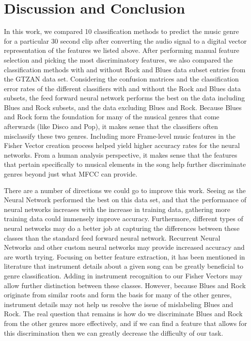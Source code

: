 \documentclass{article} %
\begin{document}
\section{Discussion and Conclusion}
In this work, we compared 10 classification methods to predict the music genre for a particular 30 second clip after converting the audio signal to a digital vector representation of the features we listed above. After performing manual feature selection and picking the most discriminatory features, we also compared the classification methods with and without Rock and Blues data subset entries from the GTZAN data set. Considering the confusion matrices and the classification error rates of the different classifiers with and without the Rock and Blues data subsets, the feed forward neural network performs the best on the data including Blues and Rock subsets, and the data excluding Blues and Rock. Because Blues and Rock form the foundation for many of the musical genres that come afterwards (like Disco and Pop), it makes sense that the classifiers often misclassify these two genres. Including more Frame-level music features in the Fisher Vector creation process helped yield higher accuracy rates for the neural networks. From a human analysis perspective, it makes sense that the features that pertain specifically to musical elements in the song help further discriminate genres beyond just what MFCC can provide.

There are a number of directions we could go to improve this work. Seeing as the Neural Network performed the best on this data set, and that the performance of neural networks increases with the increase in training data, gathering more training data could immensely improve accuracy. Furthermore, different types of neural networks may do a better job at capturing the differences between these classes than the standard feed forward neural network. Recurrent Neural Networks and other custom neural networks may provide increased accuracy and are worth trying. Focusing on better feature extraction, it has been mentioned in literature that instrument details about a given song can be greatly beneficial to genre classification. Adding in instrument recognition to our Fisher Vectors may allow further distinction between these classes. However, because Blues and Rock originate from similar roots and form the basis for many of the other genres, instrument details may not help us resolve the issue of mislabeling Blues and Rock. The real question that remains is how do we discriminate Blues and Rock from the other genres more effectively, and if we can find a feature that allows for this discrimination then we can greatly decrease the difficulty of our task.
\end{document}
